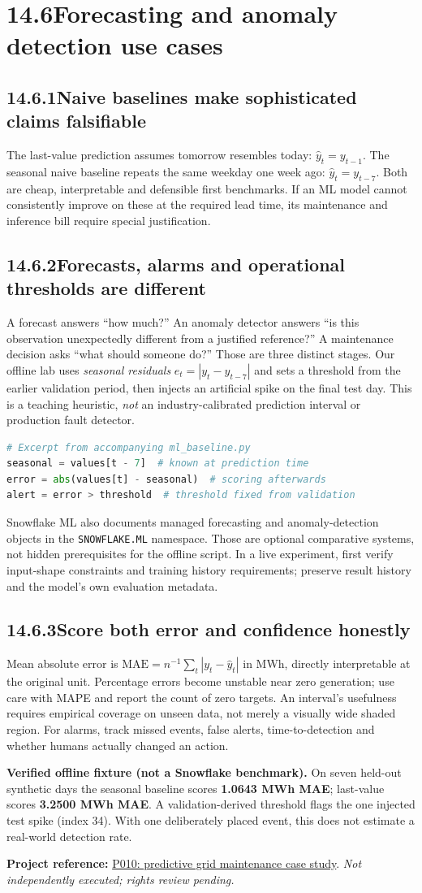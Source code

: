 \documentclass[11pt,twoside]{article}
\newcommand{\topic}[2]{\subsection*{#1\quad #2}}
\newcommand{\repo}[2]{\par\begingroup\fontsize{8.0}{9.6}\selectfont\sffamily\color{inkgray}\textbf{Project reference:} \href{#2}{#1}. \textit{Not independently executed; rights review pending.}\par\endgroup}
\begin{document}
\section*{14.6\quad Forecasting and anomaly detection use cases}
\topic{14.6.1}{Naive baselines make sophisticated claims falsifiable}
The last-value prediction assumes tomorrow resembles today: $\hat y_t=y_{t-1}$. The seasonal naive baseline repeats the same weekday one week ago: $\hat y_t=y_{t-7}$. Both are cheap, interpretable and defensible first benchmarks. If an ML model cannot consistently improve on these at the required lead time, its maintenance and inference bill require special justification.
\topic{14.6.2}{Forecasts, alarms and operational thresholds are different}
A forecast answers ``how much?'' An anomaly detector answers ``is this observation unexpectedly different from a justified reference?'' A maintenance decision asks ``what should someone do?'' Those are three distinct stages. Our offline lab uses \emph{seasonal residuals} $e_t=|y_t-y_{t-7}|$ and sets a threshold from the earlier validation period, then injects an artificial spike on the final test day. This is a teaching heuristic, \emph{not} an industry-calibrated prediction interval or production fault detector.
\begin{lstlisting}[language=Python]
# Excerpt from accompanying ml_baseline.py
seasonal = values[t - 7]  # known at prediction time
error = abs(values[t] - seasonal)  # scoring afterwards
alert = error > threshold  # threshold fixed from validation
\end{lstlisting}
Snowflake ML also documents managed forecasting and anomaly-detection objects in the \texttt{SNOWFLAKE.ML} namespace. Those are optional comparative systems, not hidden prerequisites for the offline script. In a live experiment, first verify input-shape constraints and training history requirements; preserve result history and the model's own evaluation metadata.
\topic{14.6.3}{Score both error and confidence honestly}
Mean absolute error is $\mathrm{MAE}=n^{-1}\sum_t |y_t-\hat y_t|$ in MWh, directly interpretable at the original unit. Percentage errors become unstable near zero generation; use care with MAPE and report the count of zero targets. An interval's usefulness requires empirical coverage on unseen data, not merely a visually wide shaded region. For alarms, track missed events, false alerts, time-to-detection and whether humans actually changed an action.
\begin{insight}\textbf{Verified offline fixture (not a Snowflake benchmark).} On seven held-out synthetic days the seasonal baseline scores \textbf{1.0643 MWh MAE}; last-value scores \textbf{3.2500 MWh MAE}. A validation-derived threshold flags the one injected test spike (index 34). With one deliberately placed event, this does not estimate a real-world detection rate.\end{insight}
\repo{P010: predictive grid maintenance case study}{https://github.com/Snowflake-Labs/sfguide-ai-powered-predictive-grid-maintenance}
\end{document}
